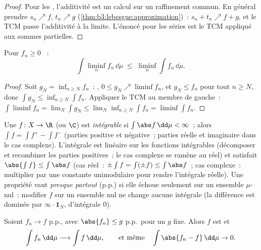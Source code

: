 \begin{proof}
Pour les , l'additivité est un calcul sur
un raffinement commun. En général prendre $s_n \nearrow f$,
$t_n \nearrow g$ (\cref{thm:b3:lebesgue:approximation})~:
$s_n + t_n \nearrow f + g$, et le TCM passe l'additivité à
la limite. L'énoncé pour les séries est le TCM appliqué aux
sommes partielles.
\end{proof}

\begin{theorem}\label{thm:b3:lebesgue:fatou}
Pour $f_n \geq 0$ ~:
\[
\int \liminf_n f_n \,\dd\mu \;\leq\; \liminf_n \int
f_n\,\dd\mu .
\]
\end{theorem}

\begin{proof}
Soit $g_N = \inf_{n\geq N}f_n$~: , $0 \leq g_N
\nearrow \liminf f_n$, et $g_N \leq f_n$ pour tout $n \geq
N$, donc $\int g_N \leq \inf_{n \geq N}\int f_n$. Appliquer
le TCM au membre de gauche~: $\int\liminf f_n =
\lim_N\int g_N \leq \lim_N\inf_{n\geq N}\int f_n =
\liminf\int f_n$.
\end{proof}

\begin{definition}\label{def:b3:lebesgue:l1}
Une $f \colon X \to \R$ (ou $\C$)  est
\emph{intégrable} si $\int\abs
f\,\dd\mu < \infty$~; alors $\int f = \int f^+ - \int f^-$
(parties positive et négative~; parties réelle et imaginaire
dans le cas complexe). L'intégrale est linéaire sur les
fonctions intégrables (décomposer et recombiner les parties
positives~; le cas complexe se ramène au réel) et satisfait
$\abs{\int f} \leq \int\abs f$ (cas réel~: $\pm\int f =
\int(\pm f) \leq \int\abs f$~; cas complexe~: multiplier par
une constante unimodulaire pour rendre l'intégrale réelle).
Une propriété vaut \emph{presque partout}
(p.p.) si elle échoue seulement sur
un ensemble $\mu$-nul~; modifier $f$ sur un ensemble nul ne
change aucune intégrale (la différence est dominée par
$\infty\cdot\mathbf 1_N$, d'intégrale $0$).
\end{definition}

\begin{theorem}\label{thm:b3:lebesgue:dct}
Soient $f_n \to f$ p.p., avec $\abs{f_n} \leq g$ p.p.\ pour
un $g$ \emph{} fixe. Alors $f$ est  et
\[
\int f_n\,\dd\mu \longrightarrow \int f\,\dd\mu,
\qquad\text{et même}\quad \int\abs{f_n - f}\,\dd\mu \to 0 .
\]
\end{theorem}

